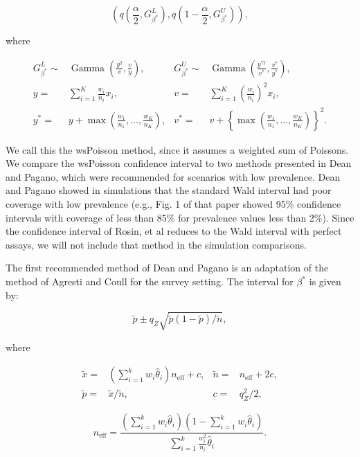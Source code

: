 \begin{equation}
    \left( q\left( \frac{\alpha}{2}, G_{\beta^*}^L \right), q \left( 1 - \frac{\alpha}{2}, G_{\beta^*}^U \right) \right),
\end{equation}


where

\begin{align*}
    G_{\beta^*}^L \sim& \operatorname{Gamma}\left( \frac{y^2}{v}, \frac{v}{y} \right), &
    G_{\beta^*}^U \sim& \operatorname{Gamma}\left( \frac{y^{*2}}{v^*}, \frac{v^*}{y^*} \right), \\
    y =& \sum_{i=1}^K \frac{w_i}{n_i} x_i, &
    v =& \sum_{i=1}^K \left( \frac{w_i}{n_i}\right)^2 x_i, \\
    y^* =& y + \max\left(\frac{w_1}{n_1}, \ldots, \frac{w_K}{n_K} \right), &
    v^* =& v + \left\{ \max\left(\frac{w_1}{n_1}, \ldots, \frac{w_K}{n_K} \right) \right\}^2.
\end{align*}

We call this the wsPoisson method, since it assumes a weighted sum of Poissons.
We compare the wsPoisson confidence interval to two methods presented in Dean and Pagano,\cite{Dean:2015} which were recommended for scenarios with low prevalence.
Dean and Pagano showed in simulations that the standard Wald interval had poor coverage with low prevalence (e.g., Fig. 1 of that paper showed 95\% confidence intervals with coverage of less than 85\% for prevalence values less than 2\%).
Since the confidence interval of Rosin, et al\cite{rosin2021estimating} reduces to the Wald interval with perfect assays, we will not include that method in the simulation comparisons.

The first recommended method of Dean and Pagano is an adaptation of the method of Agresti and Coull\cite{AgrestiCoull} for the survey setting.
The interval for \( \beta^* \) is given by:

\begin{equation}
    \tilde{p} \pm q_Z \sqrt{\tilde{p}(1 - \tilde{p}) / \tilde{n}},
\end{equation}

where


\begin{align*}
   \tilde{x} =& \left( \sum_{i=1}^k w_i \hat{\theta}_i \right) n_{\text{eff}} + c, &
   \tilde{n} =& n_{\text{eff}} + 2c, \\
    \tilde{p} =& \tilde{x} / \tilde{n}, &
   c =& q_Z^2/2,
\end{align*}

\begin{equation}
   n_{\text{eff}} = \frac{\left( \sum_{i=1}^k w_i \hat{\theta}_i \right) \left(1 - \sum_{i=1}^k w_i \hat{\theta}_i \right)}{\sum_{i=1}^k \frac{w_i^2}{n_i}\hat{\theta}_i}.
   \label{ch_3:eq:neff}
\end{equation}

